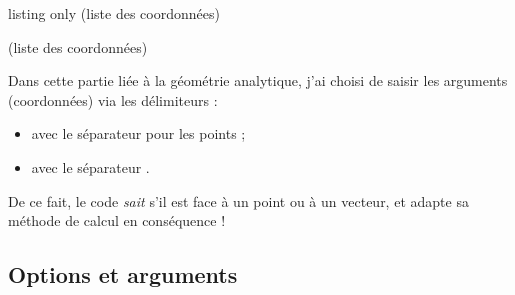 \begin{PresCodeTexPL}{listing only}
(liste des coordonnées)

(liste des coordonnées)
\end{PresCodeTexPL}

\begin{warningblock}
Dans cette partie liée à la géométrie analytique, j'ai choisi de saisir les arguments (coordonnées) via les délimiteurs  :

\begin{itemize}
	\item avec le séparateur \ctex{,} pour les points ;
	\item avec le séparateur \ctex{;}.
\end{itemize}

De ce fait, le code \textit{sait} s'il est face à un point ou à un vecteur, et adapte sa méthode de calcul en conséquence !
\end{warningblock}

\subsection{Options et arguments}

